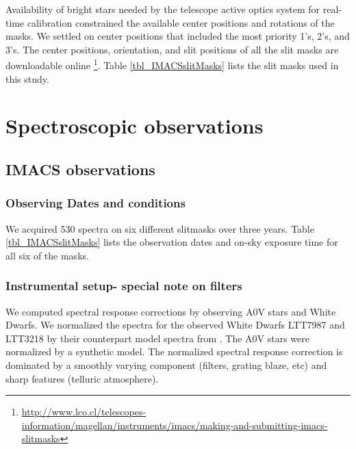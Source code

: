 Availability of bright stars needed by the telescope active optics system for real-time calibration constrained the available center positions and rotations of the masks.  We settled on center positions that included the most priority 1's, 2's, and 3's.  The center positions, orientation, and slit positions of all the slit masks are downloadable online \footnote{\url{http://www.lco.cl/telescopes-information/magellan/instruments/imacs/making-and-submitting-imacs-slitmasks}}.  Table \ref{tbl_IMACSslitMasks} lists the slit masks used in this study.

\begin{landscape}
	
\end{landscape}

\section{Spectroscopic observations}

\subsection{IMACS observations}
\subsubsection{Observing Dates and conditions}
We acquired 530 spectra on six different slitmasks over three years.  Table \ref{tbl_IMACSslitMasks} lists the observation dates and on-sky exposure time for all six of the masks.

\subsubsection{Instrumental setup- special note on filters}
We computed spectral response corrections by observing A0V stars and White Dwarfs.  We normalized the spectra for the observed White Dwarfs LTT7987 and LTT3218 by their counterpart model spectra from \citet{2014A&A...568A...9M}.  The A0V stars were normalized by a synthetic model.  The normalized spectral response correction is dominated by a smoothly varying component (filters, grating blaze, etc) and sharp features (telluric atmosphere).

